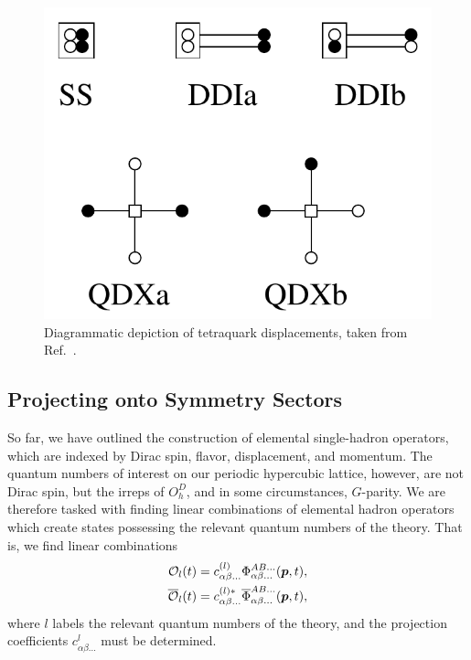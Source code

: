    \begin{figure}
        \centering
        \includegraphics[scale=0.8]{figures/tetraquark_disp.pdf}
        \caption[Diagrammatic depiction of tetraquark displacements.]{Diagrammatic depiction of tetraquark displacements, taken from Ref.~\cite{spectroscopy}.}
        \label{fig:tetraquark_disp}
    \end{figure}
    \subsection{Projecting onto Symmetry Sectors}
    So far, we have outlined the construction of elemental single-hadron operators, which are indexed by Dirac spin, flavor, displacement, and momentum. The quantum numbers of interest on our periodic hypercubic lattice, however, are not Dirac spin, but the irreps of $O_h^D$, and in some circumstances, $G$-parity. We are therefore tasked with finding linear combinations of elemental hadron operators which create states possessing the relevant quantum numbers of the theory. That is, we find linear combinations
    \begin{equation}\label{eq:op_proj}
        \begin{aligned}
            \mathcal O_l(t) &= c^{(l)}_{\alpha\beta...}\Phi^{AB...}_{\alpha\beta...}(\boldsymbol{p}, t), \\
            \overline{\mathcal O}_l(t) &= c^{(l)*}_{\alpha\beta...}\overline\Phi^{AB...}_{\alpha\beta...}(\boldsymbol{p}, t),
        \end{aligned}
    \end{equation}
    where $l$ labels the relevant quantum numbers of the theory, and the projection coefficients $c^{l}_{\alpha\beta...}$ must be determined.

